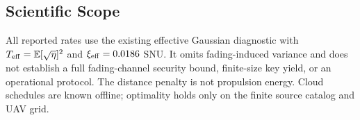 \subsection{Scientific Scope}
All reported rates use the existing effective Gaussian diagnostic with
$T_{\rm eff}=\mathbb E[\sqrt\eta]^2$ and $\xi_{\rm eff}=0.0186$ SNU.
It omits fading-induced variance and does not establish a full fading-channel security bound,
finite-size key yield, or an operational protocol. The distance penalty is not propulsion energy.
Cloud schedules are known offline; optimality holds only on the finite source catalog and UAV grid.
